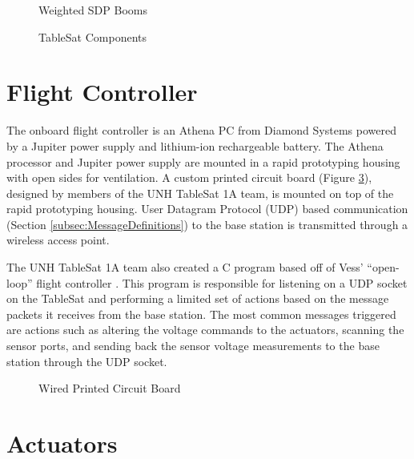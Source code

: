 \begin{figure}[H]
  \centerline{}
  \caption{Weighted SDP Booms \cite{laakso}}
  \label{fig:WeightedSDPBooms}
\end{figure}


\begin{figure}[H]
\centerline{}
\caption{TableSat Components}
\label{fig:TSatComponents}
\end{figure}

\section{Flight Controller}
\label{sec:FlightController}

The onboard flight controller is an Athena PC from Diamond Systems powered by a Jupiter power supply and lithium-ion rechargeable battery.  The Athena processor and Jupiter power supply are mounted in a rapid prototyping housing with open sides for ventilation.  A custom printed circuit board (Figure \ref{fig:WiredPCB}), designed by members of the UNH TableSat 1A team, is mounted on top of the rapid prototyping housing.  User Datagram Protocol (UDP) based communication (Section \ref{subsec:MessageDefinitions}) to the base station is transmitted through a wireless access point.

The UNH TableSat 1A team also created a C program based off of Vess' ``open-loop'' flight controller \cite{vessthesis} .  This program is responsible for listening on a UDP socket on the TableSat and performing a limited set of actions based on the message packets it receives from the base station.  The most common messages triggered are actions such as altering the voltage commands to the actuators, scanning the sensor ports, and sending back the sensor voltage measurements to the base station through the UDP socket.

\begin{figure}[ht]
  \centerline{}
  \caption{Wired Printed Circuit Board}
  \label{fig:WiredPCB}
\end{figure}


\section{Actuators}
\label{sec:Actuators}

